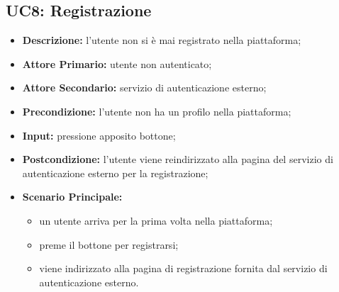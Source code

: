 \subsection{UC8: Registrazione}
\label{sec:UC8}
\begin{itemize}
    \item \textbf{Descrizione:} l'utente non si è mai registrato nella piattaforma;
    \item \textbf{Attore Primario:} utente non autenticato;
    \item \textbf{Attore Secondario:} servizio di autenticazione esterno;
    \item \textbf{Precondizione:} l'utente non ha un profilo nella piattaforma;
    \item \textbf{Input:} pressione apposito bottone;
    \item \textbf{Postcondizione:} l'utente viene reindirizzato alla pagina  del servizio di autenticazione esterno per la registrazione;
    \item \textbf{Scenario Principale:}
          \begin{itemize}
              \item un utente arriva per la prima volta nella piattaforma;
              \item preme il bottone per registrarsi;
              \item viene indirizzato alla pagina di registrazione fornita dal servizio di autenticazione esterno.
          \end{itemize}
\end{itemize}